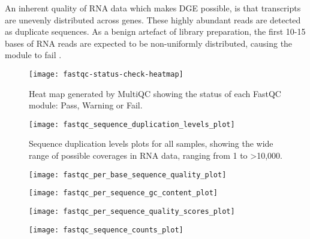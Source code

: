 An inherent quality of RNA data which makes \ac{DGE} possible, is that transcripts are unevenly distributed across genes. These highly abundant reads are detected as duplicate sequences. As a benign artefact of library preparation, the first 10-15 bases of RNA reads are expected to be non-uniformly distributed, causing the module to fail \citep{fastqctutorial2021}.


\begin{figure}[!h]
    \centering
    \texttt{[image: fastqc-status-check-heatmap]}
    \caption[Heat map showing the status of each FastQC module]{Heat map generated by MultiQC showing the status of each FastQC module: Pass, Warning or Fail.} 
    \label{fig:fastqc-status-check-heatmap}
\end{figure}

\begin{figure}[!h]
    \centering
    \texttt{[image: fastqc\_sequence\_duplication\_levels\_plot]}
    \caption[Sequence duplication levels plots for all samples]{Sequence duplication levels plots for all samples, showing the wide range of possible coverages in RNA data, ranging from 1 to >10,000.} 
    \label{fig:fastqc_sequence_duplication_levels_plot}
\end{figure}


\begin{figure}[!h]
    \centering
    \texttt{[image: fastqc\_per\_base\_sequence\_quality\_plot]}
    \caption[]{}
    \label{fig:fastqc_per_base_sequence_quality_plot}
\end{figure}

\begin{figure}[!h]
    \centering
    \texttt{[image: fastqc\_per\_sequence\_gc\_content\_plot]}
    \caption[]{}
    \label{fig:fastqc_per_sequence_gc_content_plot}
\end{figure}

\begin{figure}[!h]
    \centering
    \texttt{[image: fastqc\_per\_sequence\_quality\_scores\_plot]}
    \caption[]{}
    \label{fig:fastqc_per_sequence_quality_scores_plot}
\end{figure}

\begin{figure}[!h]
    \centering
    \texttt{[image: fastqc\_sequence\_counts\_plot]}
    \caption[]{}
    \label{fig:fastqc_sequence_counts_plot}
\end{figure}

